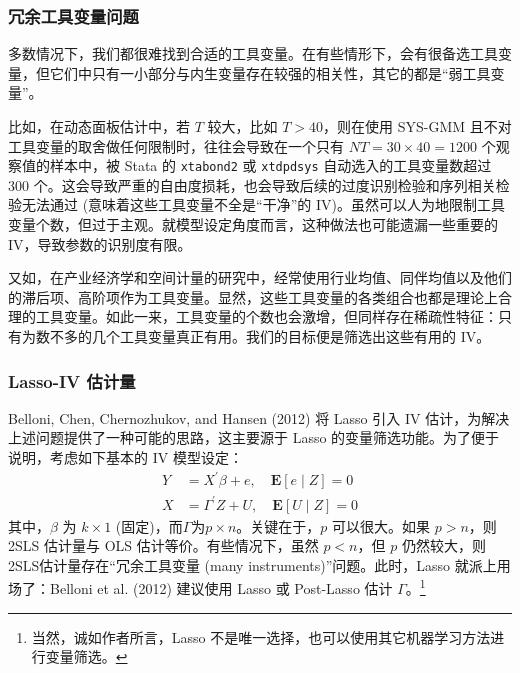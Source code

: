 {%
\subsubsection{冗余工具变量问题}
多数情况下，我们都很难找到合适的工具变量。在有些情形下，会有很备选工具变量，但它们中只有一小部分与内生变量存在较强的相关性，其它的都是“弱工具变量”。

比如，在动态面板估计中，若 $T$ 较大，比如 $T>40$，则在使用 SYS-GMM 且不对工具变量的取舍做任何限制时，往往会导致在一个只有 $NT=30 \times 40 = 1200$ 个观察值的样本中，被 Stata 的 \texttt{xtabond2} 或 \texttt{xtdpdsys} 自动选入的工具变量数超过 300 个。这会导致严重的自由度损耗，也会导致后续的过度识别检验和序列相关检验无法通过 (意味着这些工具变量不全是“干净”的 IV)。虽然可以人为地限制工具变量个数，但过于主观。就模型设定角度而言，这种做法也可能遗漏一些重要的 IV，导致参数的识别度有限。

又如，在产业经济学和空间计量的研究中，经常使用行业均值、同伴均值以及他们的滞后项、高阶项作为工具变量。显然，这些工具变量的各类组合也都是理论上合理的工具变量。如此一来，工具变量的个数也会激增，但同样存在稀疏性特征：只有为数不多的几个工具变量真正有用。我们的目标便是筛选出这些有用的 IV。

\subsubsection{Lasso-IV 估计量}
Belloni, Chen, Chernozhukov, and Hansen (2012) 将 Lasso 引入 IV 估计，为解决上述问题提供了一种可能的思路，这主要源于 Lasso 的变量筛选功能。为了便于说明，考虑如下基本的 IV 模型设定：
\begin{equation}\label{eq:lasso-iv-01}
	\begin{aligned}
	Y &=X^{\prime} \beta+e,  \quad \mathbf{E}[e \mid Z] =0 \\
	X &=\Gamma^{\prime} Z+U, \quad \mathbf{E}[U \mid Z] =0
	\end{aligned}
\end{equation}
其中，$\beta$ 为 $k\times 1$ (固定)，而$\Gamma$为$p\times n$。关键在于，$p$ 可以很大。如果 $p>n$，则 2SLS 估计量与 OLS 估计等价。有些情况下，虽然 $p<n$，但 $p$ 仍然较大，则2SLS估计量存在“冗余工具变量 (many instruments)”问题。此时，Lasso 就派上用场了：Belloni et al. (2012) 建议使用 Lasso 或 Post-Lasso 估计 $\Gamma$。\footnote{%
   当然，诚如作者所言，Lasso 不是唯一选择，也可以使用其它机器学习方法进行变量筛选。}

}
